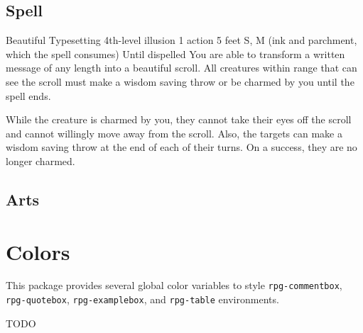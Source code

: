 \documentclass[10pt,a4paper,twocolumn,openany]{book}
\begin{document}
\section{Spell}
\begin{rpg-spell}
	{Beautiful Typesetting}
	{4th-level illusion}
	{1 action}
	{5 feet}
	{S, M (ink and parchment, which the spell consumes)}
	{Until dispelled}
	You are able to transform a written message of any length into a beautiful scroll. All creatures within range that can see the scroll must make a wisdom saving throw or be charmed by you until the spell ends.

	While the creature is charmed by you, they cannot take their eyes off the scroll and cannot willingly move away from the scroll. Also, the targets can make a wisdom saving throw at the end of each of their turns. On a success, they are no longer charmed.
\end{rpg-spell}

\section{Arts}


\lipsum
\lipsum

\chapter{Colors}

This package provides several global color variables to style \lstinline!rpg-commentbox!, \lstinline!rpg-quotebox!, \lstinline!rpg-examplebox!, and \lstinline!rpg-table! environments.


TODO
\end{document}
